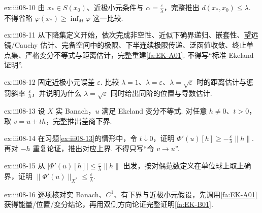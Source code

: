 \begin{FAExercise}[距离估计]{ex:iii08-10}
由 \(\displaystyle x_*\in S(x_0)\)、近极小元条件与 \(\displaystyle\alpha=\frac{\varepsilon}{\lambda}\)，完整推出 \(\displaystyle d(x_*,x_0)\leqslant\lambda\). 不得省略 \(\displaystyle\varphi(x_*)\geqslant\inf_M\varphi\) 这一比较.
\end{FAExercise}

\begin{FAExercise}{ex:iii08-11}
从下降集定义开始，依次完成非空性、近似下确界递归、嵌套性、望远镜/Cauchy 估计、完备空间中的极限、下半连续极限传递、泛函值收敛、终止单点集、严格变分不等式与距离估计，完整重建\autoref{fa:EK-A01}. 不得写“标准 Ekeland 证明”.
\end{FAExercise}

\begin{FAExercise}{ex:iii08-12}
固定近极小元误差 \(\displaystyle\varepsilon\). 比较 \(\displaystyle\lambda=1\)、\(\displaystyle\lambda=\varepsilon\)、\(\displaystyle\lambda=\sqrt{\varepsilon}\) 时的距离估计与惩罚斜率 \(\displaystyle\frac{\varepsilon}{\lambda}\)，并说明为什么 \(\displaystyle\lambda=\sqrt{\varepsilon}\) 同时给出同阶的位置与导数估计.
\end{FAExercise}

\begin{FAExercise}{ex:iii08-13}
设 \(\displaystyle X\) 实 Banach，\(\displaystyle u\) 满足 Ekeland 变分不等式. 对任意 \(\displaystyle h\neq0\)、\(\displaystyle t>0\)，取 \(\displaystyle v=u+th\)，完整推出差商下界.
\end{FAExercise}

\begin{FAExercise}[单侧方向导数估计]{ex:iii08-14}
在习题\ref{ex:iii08-13}的情形中，令 \(\displaystyle t\downarrow0\)，证明 \(\displaystyle\Phi'(u)[h]\geqslant-\frac{\varepsilon}{\lambda}\|h\|\). 再对 \(\displaystyle-h\) 重复论证，推出对应上界. 不得只写“令 \(\displaystyle v\to u\)”.
\end{FAExercise}

\begin{FAExercise}[对偶范数估计]{ex:iii08-15}
从 \(\displaystyle|\Phi'(u)[h]|\leqslant\frac{\varepsilon}{\lambda}\|h\|\) 出发，按对偶范数定义在单位球上取上确界，证明 \(\displaystyle\|\Phi'(u)\|_{X^*}\leqslant\frac{\varepsilon}{\lambda}\).
\end{FAExercise}

\begin{FAExercise}{ex:iii08-16}
逐项核对实 Banach、\(\displaystyle C^1\)、有下界与近极小元假设，先调用\autoref{fa:EK-A01}获得能量/位置/变分结论，再用双侧方向论证完整证明\autoref{fa:EK-B01}.
\end{FAExercise}

